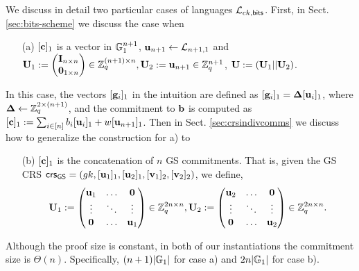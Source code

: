 We discuss in detail two particular cases of languages $\mathcal{\mathcal{L}}_{ck,\mathsf{bits}}$. First, in Sect. \ref{sec:bits-scheme} we discuss the case when 
\begin{itemize}
\item[(a)] $[\mathbf{c}]_1$ is a vector in $\mathbb{G}_1^{n+1}$,  $\mathbf{u}_{n+1} \leftarrow \mathcal{L}_{n+1,1}$ and
 $\mathbf{{U}}_1:=\begin{pmatrix}{\mathbf{{I}}_{n\times n}}\\{\mathbf{{0}}_{1\times n}}\end{pmatrix} \in \mathbb{Z}_q^{(n+1) \times n}, \mathbf{{U}}_2:=\mathbf{u}_{n+1} \in \mathbb{Z}_q^{n+1}$, $\mathbf{{U}}:=(\mathbf{{U}}_1|| \mathbf{{U}}_2)$.    
\end{itemize}
In this case, the vectors $[\mathbf{g}_i]_1$ in the intuition are defined as $[\mathbf{g}_i]_1=\mathbf{{\Delta}} [\mathbf{u}_i]_1$, where $\mathbf{{\Delta}}\gets\mathbb{Z}_q^{2\times(n+1)}$, and the commitment 
to $\mathbf{b}$ is computed as $[\mathbf{c}]_1:=\sum_{i\in[n]}b_i[\mathbf{u}_i]_1+w[\mathbf{u}_{n+1}]_1$.
Then in Sect. \ref{sec:crsindivcomms} we discuss how to generalize the construction for a) to 
\begin{itemize}
 \item[(b)] $[\mathbf{c}]_1$ is the concatenation of $n$ GS commitments. That is, given the  GS CRS   $\mathsf{crs}_{\mathsf{GS}}=(gk,[\mathbf{u}_1]_1,[\mathbf{u}_2]_1,[\mathbf{v}_1]_2,[\mathbf{v}_2]_2)$, we define,
$$\mathbf{{U}}_1:=  \begin{pmatrix} \mathbf{u}_1 & \ldots & \mathbf{0}\\ \vdots & \ddots & \vdots \\   \mathbf{0} & \ldots & \mathbf{u}_1  \end{pmatrix} \in \mathbb{Z}_q^{2n \times n},  \mathbf{{U}}_2:= \begin{pmatrix} \mathbf{u}_2 & \ldots & \mathbf{0}\\ \vdots & \ddots & \vdots \\  \mathbf{0} & \ldots & \mathbf{u}_2  \end{pmatrix} \in \mathbb{Z}_q^{2n \times n}.$$ 
\end{itemize}

Although the proof size is constant, in both of our instantiations the commitment size is $\Theta(n)$. Specifically, $(n+1)|\mathbb{G}_1|$ for case a) and $2n|\mathbb{G}_1|$ for case b).


